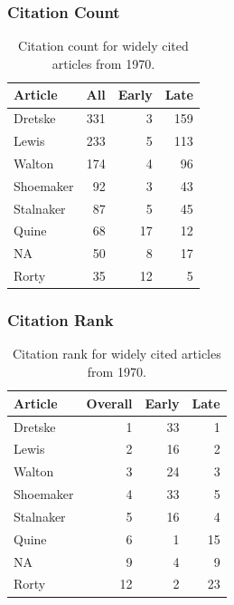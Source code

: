 \documentclass[
  10pt,
  letterpaper,
  DIV=11,
  numbers=noendperiod,
  twoside]{scrartcl}
\begin{document}
\subsubsection*{Citation Count}\label{sec-count-1970}

\begin{longtable}[]{@{}lrrr@{}}

\caption{\label{tbl-citation-count-1970}Citation count for widely cited
articles from 1970.}

\tabularnewline

\toprule\noalign{}
Article & All & Early & Late \\
\midrule\noalign{}
\endhead
\bottomrule\noalign{}
\endlastfoot
Dretske & 331 & 3 & 159 \\
Lewis & 233 & 5 & 113 \\
Walton & 174 & 4 & 96 \\
Shoemaker & 92 & 3 & 43 \\
Stalnaker & 87 & 5 & 45 \\
Quine & 68 & 17 & 12 \\
NA & 50 & 8 & 17 \\
Rorty & 35 & 12 & 5 \\

\end{longtable}

\subsubsection*{Citation Rank}\label{sec-rank-1970}

\begin{longtable}[]{@{}lrrr@{}}

\caption{\label{tbl-citation-rank-1970}Citation rank for widely cited
articles from 1970.}

\tabularnewline

\toprule\noalign{}
Article & Overall & Early & Late \\
\midrule\noalign{}
\endhead
\bottomrule\noalign{}
\endlastfoot
Dretske & 1 & 33 & 1 \\
Lewis & 2 & 16 & 2 \\
Walton & 3 & 24 & 3 \\
Shoemaker & 4 & 33 & 5 \\
Stalnaker & 5 & 16 & 4 \\
Quine & 6 & 1 & 15 \\
NA & 9 & 4 & 9 \\
Rorty & 12 & 2 & 23 \\

\end{longtable}
\end{document}
